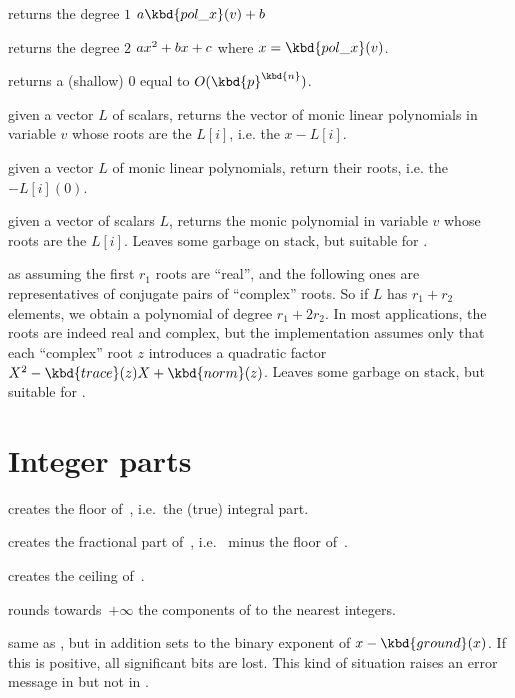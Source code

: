  returns the degree $1$
 $a\kbd{pol\_x}(v) + b$

 returns the degree $2$
 $a\*x^2+b\*x+c$ where $x=\kbd{pol\_x}(v)$.

 returns a (shallow) $0$
 equal to $O(\kbd{p}^\kbd{n})$.


 given a vector $L$ of scalars,
returns the vector of monic linear polynomials in variable $v$ whose roots
are the $L[i]$, i.e. the $x - L[i]$.

 given a vector $L$ of monic linear
polynomials, return their roots, i.e. the $- L[i](0)$.

 given a vector of scalars $L$,
returns the monic polynomial in variable $v$ whose roots are the $L[i]$.
Leaves some garbage on stack, but suitable for .

 as 
assuming the first $r_1$ roots are ``real'', and the following ones are
representatives of conjugate pairs of ``complex'' roots. So if $L$ has $r_1 +
r_2$ elements, we obtain a polynomial of degree $r_1 + 2r_2$. In most
applications, the roots are indeed real and complex, but the implementation
assumes only that each ``complex'' root $z$ introduces a quadratic
factor $X^2 - \kbd{trace}(z) X + \kbd{norm}(z)$.
Leaves some garbage on stack, but suitable for .

\section{Integer parts}

 creates the floor of~, i.e.\ the (true)
integral part.

 creates the fractional part of~, i.e.\ 
minus the floor of~.

 creates the ceiling of~.

 rounds towards~$+\infty$ the components of 
to the nearest integers.

 same as , but in addition sets
 to the binary exponent of $x - \kbd{ground}(x)$. If this is
positive, all significant bits are lost. This kind of situation raises an
error message in  but not in .

